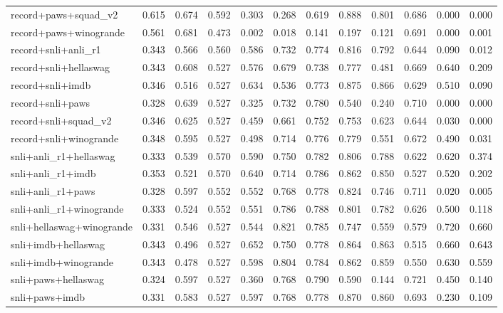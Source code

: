 \begin{table}[t]
\begin{tabular}{lrrrrrrrrrrr}
    record+paws+squad\_v2 & 0.615 & 0.674 & 0.592 & 0.303 & 0.268 & 0.619 & 0.888 & 0.801 & 0.686 & 0.000 & 0.000 \\
    record+paws+winogrande & 0.561 & 0.681 & 0.473 & 0.002 & 0.018 & 0.141 & 0.197 & 0.121 & 0.691 & 0.000 & 0.001 \\
    record+snli+anli\_r1 & 0.343 & 0.566 & 0.560 & 0.586 & 0.732 & 0.774 & 0.816 & 0.792 & 0.644 & 0.090 & 0.012 \\
    record+snli+hellaswag & 0.343 & 0.608 & 0.527 & 0.576 & 0.679 & 0.738 & 0.777 & 0.481 & 0.669 & 0.640 & 0.209 \\
    record+snli+imdb & 0.346 & 0.516 & 0.527 & 0.634 & 0.536 & 0.773 & 0.875 & 0.866 & 0.629 & 0.510 & 0.090 \\
    record+snli+paws & 0.328 & 0.639 & 0.527 & 0.325 & 0.732 & 0.780 & 0.540 & 0.240 & 0.710 & 0.000 & 0.000 \\
    record+snli+squad\_v2 & 0.346 & 0.625 & 0.527 & 0.459 & 0.661 & 0.752 & 0.753 & 0.623 & 0.644 & 0.030 & 0.000 \\
    record+snli+winogrande & 0.348 & 0.595 & 0.527 & 0.498 & 0.714 & 0.776 & 0.779 & 0.551 & 0.672 & 0.490 & 0.031 \\
    snli+anli\_r1+hellaswag & 0.333 & 0.539 & 0.570 & 0.590 & 0.750 & 0.782 & 0.806 & 0.788 & 0.622 & 0.620 & 0.374 \\
    snli+anli\_r1+imdb & 0.353 & 0.521 & 0.570 & 0.640 & 0.714 & 0.786 & 0.862 & 0.850 & 0.527 & 0.520 & 0.202 \\
    snli+anli\_r1+paws & 0.328 & 0.597 & 0.552 & 0.552 & 0.768 & 0.778 & 0.824 & 0.746 & 0.711 & 0.020 & 0.005 \\
    snli+anli\_r1+winogrande & 0.333 & 0.524 & 0.552 & 0.551 & 0.786 & 0.788 & 0.801 & 0.782 & 0.626 & 0.500 & 0.118 \\
    snli+hellaswag+winogrande & 0.331 & 0.546 & 0.527 & 0.544 & 0.821 & 0.785 & 0.747 & 0.559 & 0.579 & 0.720 & 0.660 \\
    snli+imdb+hellaswag & 0.343 & 0.496 & 0.527 & 0.652 & 0.750 & 0.778 & 0.864 & 0.863 & 0.515 & 0.660 & 0.643 \\
    snli+imdb+winogrande & 0.343 & 0.478 & 0.527 & 0.598 & 0.804 & 0.784 & 0.862 & 0.859 & 0.550 & 0.630 & 0.559 \\
    snli+paws+hellaswag & 0.324 & 0.597 & 0.527 & 0.360 & 0.768 & 0.790 & 0.590 & 0.144 & 0.721 & 0.450 & 0.140 \\
    snli+paws+imdb & 0.331 & 0.583 & 0.527 & 0.597 & 0.768 & 0.778 & 0.870 & 0.860 & 0.693 & 0.230 & 0.109 \\

\end{tabular}
\end{table}
